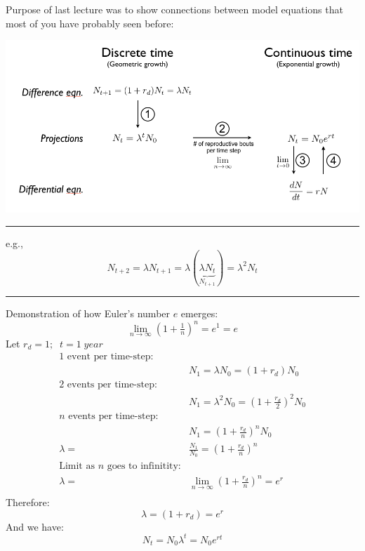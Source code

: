 \documentclass{article}
\newcommand*\circled[1]{\tikz[baseline=(char.base)]{
            \node[shape=circle,draw,inner sep=2pt] (char) {#1};}}
\begin{document}
\noindent{}

Purpose of last lecture was to show connections between model equations that most of you have probably seen before:

\begin{center}
\includegraphics[width=16cm]{figs/EqnConnections.png}
\end{center}

\rule[0.5ex]{\linewidth}{1pt}

\circled{1}
e.g.,
\begin{equation*}
	N_{t+2}=\lambda N_{t+1}= \lambda (\underbrace{\lambda N_t}_{N_{t+1}}) = \lambda^2 N_t
\end{equation*}


\rule[0.5ex]{\linewidth}{1pt}

\circled{2}
Demonstration of how Euler's number $e$ emerges:
\begin{equation*}
	\boxed{ \lim_{n \to \infty}\left(1+\tfrac{1}{n}\right)^n	= e^1=e}
\end{equation*}
Let $r_d=1;  \;\; t=1 \; year$
\begin{align*}
\text{1 event per time-step:}&\\
	& N_1 = \lambda N_0=(1+r_d)N_0\\[1.5em]
\text{2 events per time-step:}&\\
	& N_1 = \lambda^2 N_0 = \left(1+\tfrac{r_d}{2}\right)^2 N_0 \\[1.5em]
n \text{ events per time-step:}&\\
	& N_1 = \left(1+\tfrac{r_d}{n}\right)^n N_0\\
	 \lambda  = & \frac{N_1}{N_0}=\left(1+\tfrac{r_d}{n}\right)^n\\
\text{Limit as }n \text{ goes to infinitity:}&\\
	\lambda = & \lim_{n \to \infty}\left(1+\tfrac{r_d}{n}\right)^n = e^r \\[1em]
\end{align*}
Therefore:
\begin{equation*}
	\lambda = (1+r_d) = e^r
\end{equation*}
And we have:
\begin{equation*}
	N_t=N_0 \lambda^t=  N_0 e^{rt}
\end{equation*}
\end{document}
